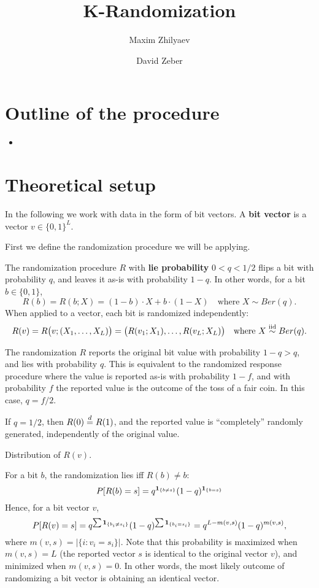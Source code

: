 \documentclass[11pt,draft]{amsart}
\title{K-Randomization}
\author{Maxim Zhilyaev \and David Zeber}
\begin{document}
\maketitle

\section*{Outline of the procedure}
\begin{itemize}
   \item 
\end{itemize}

\section{Theoretical setup}
In the following we work with data in the form of bit vectors. A \textbf{bit
vector} is a vector $v \in \{0,1\}^L$.

First we define the randomization procedure we will be applying.

\begin{defn}
    The randomization procedure $R$ with \textbf{lie probability} $0 < q < 1/2$
    flips a bit with probability $q$, and leaves
it as-is with probability $1-q$. 
In other words, for a bit $b \in \{0,1\}$,
\[ R(b) = R(b; X) = (1-b)\cdot X + b \cdot (1-X) \quad\text{where } 
X\sim Ber(q). \]
When applied to a vector, each bit is randomized independently:
\[ R(v) = R\big(v; (X_1,\dots,X_L)\big) = 
    \big(R(v_1; X_1),\dots,R(v_L; X_L)\big) 
\quad\text{where } X \stackrel{\text{iid}}{\sim} Ber(q). \]
\end{defn}

\begin{rmk}
    The randomization $R$ reports the original bit value with probability 
    $1-q > q$, and lies with probability $q$. 
    This is equivalent to the randomized response procedure where the value is 
    reported as-is with probability $1-f$, and with probability $f$ the reported 
    value is the outcome of the toss of a fair coin. 
    In this case, $q = f/2$.
\end{rmk}
\begin{rmk}
    If $q = 1/2$, then $R(0)\stackrel{d}{=} R(1)$, and the reported value is 
    ``completely'' randomly generated, \ie independently of the original value.
\end{rmk}

Distribution of $R(v)$.

For a bit $b$, the randomization lies iff $R(b) \neq b$: 
\[
    P[R(b) = s] = q^{\operatorname{\mathbf{1}}_{\{b \neq s\}}}(1-q)^{\operatorname{\mathbf{1}}_{\{b = s\}}}
\]
Hence, for a bit vector $v$, 
\[ P[R(v) = s] = q^{\sum\operatorname{\mathbf{1}}_{\{b_i \neq s_i\}}}(1-q)^{\sum\operatorname{\mathbf{1}}_{\{b_i = s_i\}}} 
    = q^{L-m(v,s)}(1-q)^{m(v,s)}, \]
where $m(v,s) = |\{i: v_i = s_i\}|$. 
Note that this probability is maximized when $m(v,s) = L$ (the reported vector
$s$ is identical to the original vector $v$), and minimized when $m(v,s) = 0$.
In other words, the most likely outcome of randomizing a bit vector is obtaining
an identical vector.
\end{document}
